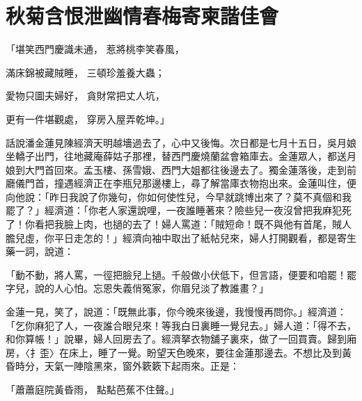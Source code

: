 %

\chapter{秋菊含恨泄幽情\KG 春梅寄柬諧佳會}


\begin{showcontents}{}



「堪笑西門慶識未通，  惹將桃李笑春風，

滿床錦被藏賊睡，   三頓珍羞養大蟲；

愛物只圖夫婦好，   貪財常把丈人坑，

更有一件堪觀處，   穿房入屋弄乾坤。」

話說潘金蓮見陳經濟天明越墻過去了，心中又後悔。次日都是七月十五日，吳月娘坐轎子出門，往地藏庵薛姑子那裡，替西門慶燒蘭盆會箱庫去。金蓮眾人，都送月娘到大門首回來。孟玉樓、孫雪娥、西門大姐都往後邊去了。獨金蓮落後，走到前廳儀門首，撞遇經濟正在李瓶兒那邊樓上，尋了解當庫衣物抱出來。金蓮叫住，便向他說：「昨日我說了你幾句，你如何使性兒，今早就跳博出來了？莫不真個和我罷了？」經濟道：「你老人家還說哩，一夜誰睡著來？險些兒一夜沒曾把我麻犯死了！你看把我臉上肉，也撾的去了！婦人罵道：「賊短命！既不與他有首尾，賊人膽兒虛，你平日走怎的！」經濟向袖中取出了紙帖兒來，婦人打開觀看，都是寄生藥一詞，說道：

「動不動，將人罵，一徑把臉兒上撾。千般做小伏低下，但言語，便要和咱罷！罷字兒，說的人心怕。忘恩失義俏冤家，你眉兒淡了教誰畫？」

金蓮一見，笑了，說道：「既無此事，你今晚來後邊，我慢慢再問你。」經濟道：「乞你麻犯了人，一夜誰合眼兒來！等我白日裏睡一覺兒去。」婦人道：「得不去，和你算帳！」說畢，婦人回房去了。經濟拏衣物舖子裏來，做了一回買賣。歸到廂房，〈扌歪〉在床上，睡了一覺。盼望天色晚來，要往金蓮那邊去。不想比及到黃昏時分，天氣一陣陰黑來，窗外簌簌下起雨來。正是：

「蕭蕭庭院黃昏雨，  點點芭蕉不住聲。」


\end{showcontents}
